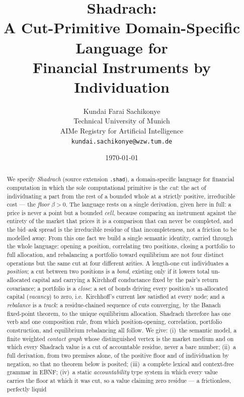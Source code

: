 \documentclass[11pt,a4paper]{article}
\title{\textbf{Shadrach:\\[3pt]
A Cut-Primitive Domain-Specific Language for\\
Financial Instruments by Individuation}}
\author{%
Kundai Farai Sachikonye\\
\small Technical University of Munich\\
\small AIMe Registry for Artificial Intelligence\\
\small \texttt{kundai.sachikonye@wzw.tum.de}}
\date{\today}
\theoremstyle{thmstyle}
\theoremstyle{definition}
\theoremstyle{remark}
\newcommand{\flo}{\beta}
\newcommand{\sh}[1]{\texttt{#1}}
\begin{document}
\maketitle

\begin{abstract}
\noindent
We specify \emph{Shadrach} (source extension \sh{.shad}), a
domain-specific language for financial computation in which the sole
computational primitive is the \emph{cut}: the act of individuating a
part from the rest of a bounded whole at a strictly positive,
irreducible cost --- the \emph{floor} $\flo>0$. The language rests on a
single derivation, given here in full: a price is never a point but a
bounded \emph{cell}, because comparing an instrument against the
entirety of the market that prices it is a comparison that can never be
completed, and the bid--ask spread is the irreducible residue of that
incompleteness, not a friction to be modelled away. From this one fact
we build a single semantic identity, carried through the whole
language: opening a position, correlating two positions, closing a
portfolio to full allocation, and rebalancing a portfolio toward
equilibrium are not four distinct operations but the same cut at four
different arities. A length-one cut individuates a \emph{position}; a
cut between two positions is a \emph{bond}, existing only if it lowers
total un-allocated capital and carrying a Kirchhoff conductance fixed by
the pair's return covariance; a portfolio is a \emph{close}: a set of
bonds driving every position's un-allocated capital (\emph{vacancy}) to
zero, i.e.\ Kirchhoff's current law satisfied at every node; and a
\emph{rebalance} is a \emph{track}: a residue-chained sequence of cuts
converging, by the Banach fixed-point theorem, to the unique
equilibrium allocation. Shadrach therefore has one verb and one
composition rule, from which position-opening, correlation, portfolio
construction, and equilibrium rebalancing all follow. We give: (i)~the
semantic model, a finite weighted \emph{contact graph} whose distinguished
vertex is the market medium and on which every Shadrach value is a cut
of accountable residue, never a bare number; (ii)~a full derivation, from
two premises alone, of the positive floor and of individuation by
negation, so that no theorem below is posited; (iii)~a complete lexical
and context-free grammar in EBNF; (iv)~a static \emph{accountability}
type system in which every value carries the floor at which it was cut,
so a value claiming zero residue --- a frictionless, perfectly liquid

\end{abstract}
\end{document}
